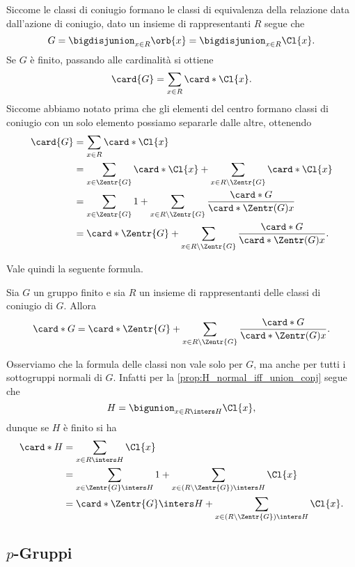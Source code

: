 Siccome le classi di coniugio formano le classi di equivalenza della relazione data dall'azione di coniugio, dato un insieme di rappresentanti $R$ segue che \[
    G = \bigdisjunion_{x \in R} \orb{x} = \bigdisjunion_{x \in R} \Cl{x}.
\] Se $G$ è finito, passando alle cardinalità si ottiene \[
    \card{G} = \sum_{x \in R} \card*{\Cl{x}}. 
\] Siccome abbiamo notato prima che gli elementi del centro formano classi di coniugio con un solo elemento possiamo separarle dalle altre, ottenendo
\begin{align*}
    \card{G} &= \sum_{x \in R} \card*{\Cl{x}}\\
    &= \sum_{x \in \Zentr{G}} \card*{\Cl{x}} + \sum_{x \in R \setminus \Zentr{G}} \card*{\Cl{x}}\\
    &= \sum_{x \in \Zentr{G}} 1 + \sum_{x \in R \setminus \Zentr{G}} \frac{\card*{G}}{\card*{\Zentr(G){x}}}\\
    &= \card*{\Zentr{G}} + \sum_{x \in R \setminus \Zentr{G}} \frac{\card*{G}}{\card*{\Zentr(G){x}}}.
\end{align*}

Vale quindi la seguente formula.
\begin{theorem}
    Sia $G$ un gruppo finito e sia $R$ un insieme di rappresentanti delle classi di coniugio di $G$.
    Allora \begin{equation}
        \label{eq:class_formula}
        \card*{G} = \card*{\Zentr{G}} + \sum_{x \in R \setminus \Zentr{G}} \frac{\card*{G}}{\card*{\Zentr(G){x}}}.
    \end{equation}
\end{theorem}

Osserviamo che la formula delle classi non vale solo per $G$, ma anche per tutti i sottogruppi normali di $G$. Infatti per la \autoref{prop:H_normal_iff_union_conj} segue che \[
    H = \bigunion_{x \in R \inters H} \Cl{x},    
\] dunque se $H$ è finito si ha \begin{align*}
    \card*{H} &= \sum_{x \in R \inters H} \Cl{x}\\
    &= \sum_{x \in \Zentr{G} \inters H} 1 + \sum_{{x \in (R \setminus \Zentr{G}) \inters H}} \Cl{x}\\
    &= \card*{\Zentr{G} \inters H} + \sum_{{x \in (R \setminus \Zentr{G}) \inters H}} \Cl{x}. 
\end{align*}

\subsection{$p$-Gruppi}

